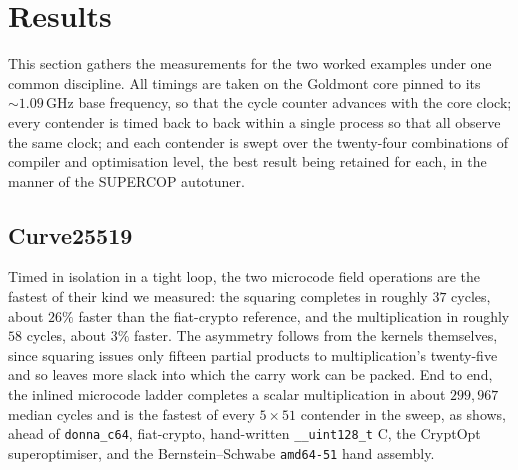 
%
%

\section{Results}
\label{sec:results}

This section gathers the measurements for the two worked examples under one
common discipline. All timings are taken on the Goldmont core pinned to its
$\sim\!1.09$\,GHz base frequency, so that the cycle counter advances with the
core clock; every contender is timed back to back within a single process so
that all observe the same clock; and each contender is swept over the
twenty-four combinations of compiler and optimisation level, the best result
being retained for each, in the manner of the SUPERCOP autotuner.

\subsection{Curve25519}
\label{sec:res-c25519}

Timed in isolation in a tight loop, the two microcode field operations are the
fastest of their kind we measured: the squaring completes in roughly $37$ cycles,
about $26\%$ faster than the fiat-crypto reference, and the multiplication in
roughly $58$ cycles, about $3\%$ faster. The asymmetry follows from the kernels
themselves, since squaring issues only fifteen partial products to
multiplication's twenty-five and so leaves more slack into which the carry work
can be packed. End to end, the inlined microcode ladder completes a scalar
multiplication in about $299{,}967$ median cycles and is the fastest of every
$5\times51$ contender in the sweep, as  shows, ahead of
\texttt{donna\_c64}, fiat-crypto, hand-written \texttt{\_\_uint128\_t} C, the
CryptOpt superoptimiser, and the Bernstein--Schwabe \texttt{amd64-51} hand
assembly.

